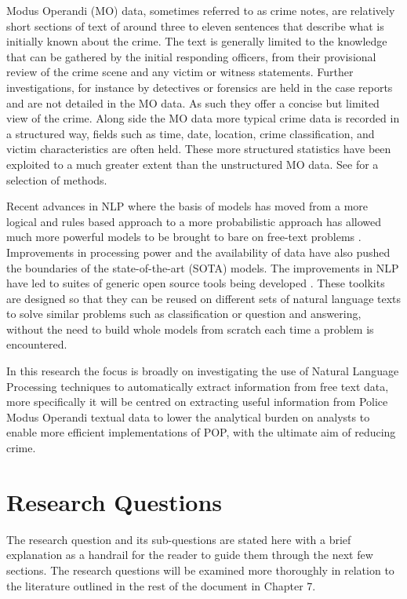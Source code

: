 Modus Operandi (MO) data, sometimes referred to as crime notes, are relatively short sections of text of around three to eleven  sentences that describe what is initially known about the crime.  The text is generally limited to the knowledge that can be gathered by the initial responding officers, from their provisional review of the crime scene and any victim or witness statements. Further investigations,  for instance by detectives or forensics are held in the case reports and are not detailed in the MO data. As such they offer a concise but limited view of the crime. Along side the MO data more typical crime data is recorded in a structured way, fields such as time, date, location, crime classification, and victim characteristics are often held. These more structured statistics have been exploited to a much greater extent  than the unstructured MO data. See \textcite{mapchap10, ratcliffe1998aoristic, braga2014effects, weisel2016analyzing}  for a selection of methods.

Recent advances in NLP where the basis of models has moved from a more logical and rules based approach to a more probabilistic approach has allowed much more powerful models to be brought to bare on free-text problems \parencite{kumar2011natural}. Improvements in processing power and the availability of data have also pushed the boundaries of the state-of-the-art (SOTA) models. The improvements in NLP have led to suites of generic open source tools being developed  \parencite{manning2014stanford, benoit2018quanteda, loper2002nltk}. These toolkits are designed so that they can be reused on different sets of natural language texts to solve similar problems such as classification or question and answering, without the need to build whole models from scratch each time a problem is encountered.

In this research the focus is broadly on investigating the use of Natural Language Processing techniques to automatically extract information from free text data, more specifically it will be centred on extracting useful information from Police Modus Operandi textual data to lower the analytical burden on analysts to enable more efficient implementations of POP, with the ultimate aim of reducing crime.



\section{Research Questions}

The research question and its sub-questions are stated here with a brief explanation as a handrail for the reader to guide them through the next few sections. The research questions will be examined more thoroughly in relation to the literature outlined in the rest of the document in Chapter 7.

